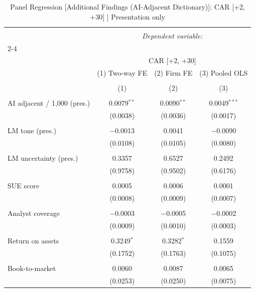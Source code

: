 
\begin{table}[!htbp] \centering 
  \caption{Panel Regression [Additional Findings (AI-Adjacent Dictionary)]: CAR [+2, +30]  |  Presentation only} 
  \label{} 
\begin{tabular}{@{\extracolsep{5pt}}lccc} 
\\[-1.8ex]\hline 
\hline \\[-1.8ex] 
 & \multicolumn{3}{c}{\textit{Dependent variable:}} \\ 
\cline{2-4} 
\\[-1.8ex] & \multicolumn{3}{c}{CAR [+2, +30]} \\ 
 & (1) Two-way FE & (2) Firm FE & (3) Pooled OLS \\ 
\\[-1.8ex] & (1) & (2) & (3)\\ 
\hline \\[-1.8ex] 
 AI adjacent / 1,000 (pres.) & 0.0079$^{**}$ & 0.0090$^{**}$ & 0.0049$^{***}$ \\ 
  & (0.0038) & (0.0036) & (0.0017) \\ 
  & & & \\ 
 LM tone (pres.) & $-$0.0013 & 0.0041 & $-$0.0090 \\ 
  & (0.0108) & (0.0105) & (0.0080) \\ 
  & & & \\ 
 LM uncertainty (pres.) & 0.3357 & 0.6527 & 0.2492 \\ 
  & (0.9758) & (0.9502) & (0.6176) \\ 
  & & & \\ 
 SUE score & 0.0005 & 0.0006 & 0.0001 \\ 
  & (0.0008) & (0.0009) & (0.0007) \\ 
  & & & \\ 
 Analyst coverage & $-$0.0003 & $-$0.0005 & $-$0.0002 \\ 
  & (0.0009) & (0.0010) & (0.0003) \\ 
  & & & \\ 
 Return on assets & 0.3249$^{*}$ & 0.3282$^{*}$ & 0.1559 \\ 
  & (0.1752) & (0.1763) & (0.1075) \\ 
  & & & \\ 
 Book-to-market & 0.0060 & 0.0087 & 0.0065 \\ 
  & (0.0253) & (0.0250) & (0.0075) \\ 

\end{tabular}
\end{table}
